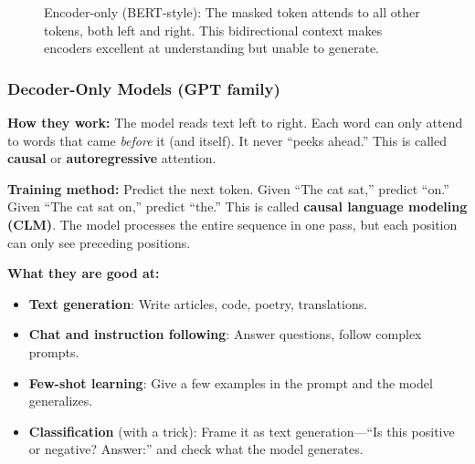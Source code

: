 \documentclass[11pt,a4paper]{article}
\begin{document}
\begin{figure}[H]
\centering
{}
\caption{Encoder-only (BERT-style): The masked token attends to all other tokens, both left and right. This bidirectional context makes encoders excellent at understanding but unable to generate.}
\label{fig:encoder}
\end{figure}

\subsubsection{Decoder-Only Models (GPT family)}

\textbf{How they work:} The model reads text left to right. Each word can only attend to words that came \emph{before} it (and itself). It never ``peeks ahead.'' This is called \textbf{causal} or \textbf{autoregressive} attention.

\textbf{Training method:} Predict the next token. Given ``The cat sat,'' predict ``on.'' Given ``The cat sat on,'' predict ``the.'' This is called \textbf{causal language modeling (CLM)}. The model processes the entire sequence in one pass, but each position can only see preceding positions.

\textbf{What they are good at:}
\begin{itemize}
    \item \textbf{Text generation}: Write articles, code, poetry, translations.
    \item \textbf{Chat and instruction following}: Answer questions, follow complex prompts.
    \item \textbf{Few-shot learning}: Give a few examples in the prompt and the model generalizes.
    \item \textbf{Classification} (with a trick): Frame it as text generation---``Is this positive or negative? Answer:'' and check what the model generates.
\end{itemize}
\end{document}
